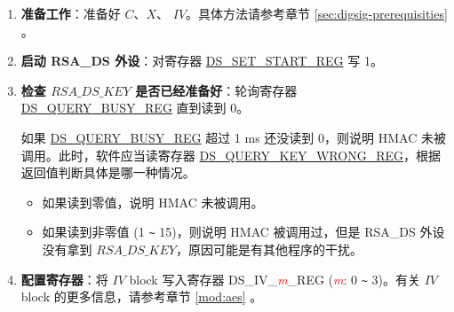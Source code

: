 \documentclass[main\_\_CN.tex]{subfiles}
\begin{document}
\begin{enumerate}
    
    \item {\bfseries 准备工作}：准备好 \begin{math}C\end{math}、\begin{math}X\end{math}、 \begin{math}IV\end{math}。具体方法请参考章节 \ref{sec:digsig-prerequisities} 。
    
    \item {\bfseries 启动 RSA\_DS 外设}：对寄存器 \hyperref[regdesc:DSSETSTARTREG]{DS\_SET\_START\_REG} 写 1。
    
    \item {\bfseries 检查 \begin{math}RSA\_DS\_KEY\end{math} 是否已经准备好}：轮询寄存器 \hyperref[regdesc:DSQUERYBUSYREG]{DS\_QUERY\_BUSY\_REG} 直到读到 0。
    
    如果 \hyperref[regdesc:DSQUERYBUSYREG]{DS\_QUERY\_BUSY\_REG} 超过 1 ms 还没读到 0，则说明 HMAC 未被调用。此时，软件应当读寄存器 \hyperref[regdesc:DSQUERYKEYWRONGREG]{DS\_QUERY\_KEY\_WRONG\_REG}，根据返回值判断具体是哪一种情况。 
    \begin{itemize}
    
        \item 如果读到零值，说明 HMAC 未被调用。
        
        \item 如果读到非零值 (1 \verb+~+ 15)，则说明 HMAC 被调用过，但是 RSA\_DS 外设没有拿到 \begin{math}RSA\_DS\_KEY\end{math}，原因可能是有其他程序的干扰。
        
    \end{itemize}
    
    \item {\bfseries 配置寄存器}：将 \begin{math}IV\end{math} block 写入寄存器 DS\_IV\_\textcolor{red}{\it{m}}\_REG (\textcolor{red}{\it{m}}: 0 \verb+~+ 3)。有关 \begin{math}IV\end{math} block 的更多信息，请参考章节 \ref{mod:aes} \textit{}。


\end{enumerate}
\end{document}
